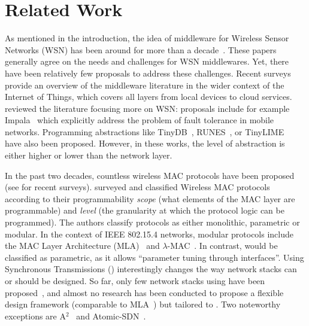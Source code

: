 
\section{Related Work}
\label{sec:relwork}

As mentioned in the introduction, the idea of middleware for Wireless Sensor Networks (WSN) has been around for more than a decade~\cite{romer2004Programming,chatzigiannakis200750,wang2008Middleware,mottola2012Middleware}.
These papers generally agree on the needs and challenges for WSN middlewares.
Yet, there have been relatively few proposals to address these challenges.
Recent surveys~\cite{razzaque2016Middleware,onderwater2016overview} provide an overview of the middleware literature in the wider context of the Internet of Things, which covers all layers from local devices to cloud services.
\cite{mottola2012Middleware} reviewed the literature focusing more on WSN:
proposals include for example Impala~\cite{liu2003Impala} which explicitly address the problem of fault tolerance in mobile networks.
Programming abstractions like TinyDB~\cite{madden2005TinyDB}, RUNES~\cite{costa2005RUNES}, or TinyLIME~\cite{costa2007Programming} have also been proposed.
However, in these works, the level of abstraction is either higher or lower than the network layer.

In the past two decades, countless wireless MAC protocols have been proposed (see \eg \cite{teleshermeto2017Scheduling,bartolomeu2016Survey} for recent surveys).
%
\cite{isolani2018Survey} surveyed and classified Wireless MAC protocols according to their programmability \emph{scope} (what elements of the MAC layer are programmable) and \emph{level} (the granularity at which the protocol logic can be programmed). The authors classify protocols as either monolithic, parametric or modular.
In the context of IEEE 802.15.4 networks, modular protocols include \eg the MAC Layer Architecture (MLA)~\cite{klues2007MLA} and $\lambda$-MAC~\cite{parker2010lambda}. In contrast, \baloo would be classified as parametric, as it allows ``parameter tuning through interfaces''.
Using Synchronous Transmissions (\ST) interestingly changes the way network stacks can or should be designed.
So far, only few network stacks using \ST have been proposed~\cite{ferrari2012LWB,istomin2018Interferenceresilient,sarkar2016Sleeping,sutton2017eLWB,jacob2017TTW_extended,suzuki2013Choco}, and almost no research has been conducted to propose a flexible design framework (\eg comparable to MLA~\cite{klues2007MLA}) but tailored to \ST.
Two noteworthy exceptions are A$^2$~\cite{alnahas2017a2} and Atomic-SDN~\cite{baddeley2019AtomicSDN}.

